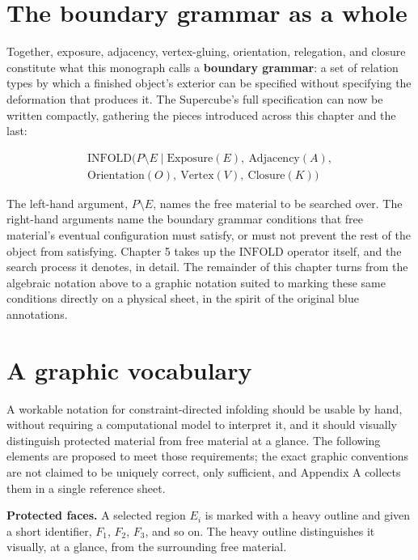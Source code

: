 \documentclass[11pt,oneside]{book}
\begin{document}
\hypertarget{the-boundary-grammar-as-a-whole}{%
\section{The boundary grammar as a
whole}\label{the-boundary-grammar-as-a-whole}}

Together, exposure, adjacency, vertex-gluing, orientation, relegation,
and closure constitute what this monograph calls a \textbf{boundary
grammar}: a set of relation types by which a finished object's exterior
can be specified without specifying the deformation that produces it.
The Supercube's full specification can now be written compactly,
gathering the pieces introduced across this chapter and the last:

\begin{gather*}
\text{INFOLD}(P \setminus E \mid \text{Exposure}(E),\ \text{Adjacency}(A),\\
\text{Orientation}(O),\ \text{Vertex}(V),\ \text{Closure}(K))
\end{gather*}

The left-hand argument, \(P \setminus E\), names the free material to be
searched over. The right-hand arguments name the boundary grammar
conditions that free material's eventual configuration must satisfy, or
must not prevent the rest of the object from satisfying. Chapter 5 takes
up the \(\text{INFOLD}\) operator itself, and the search process it
denotes, in detail. The remainder of this chapter turns from the
algebraic notation above to a graphic notation suited to marking these
same conditions directly on a physical sheet, in the spirit of the
original blue annotations.

\hypertarget{a-graphic-vocabulary}{%
\section{A graphic vocabulary}\label{a-graphic-vocabulary}}

A workable notation for constraint-directed infolding should be usable
by hand, without requiring a computational model to interpret it, and it
should visually distinguish protected material from free material at a
glance. The following elements are proposed to meet those requirements;
the exact graphic conventions are not claimed to be uniquely correct,
only sufficient, and Appendix A collects them in a single reference
sheet.

\textbf{Protected faces.} A selected region \(E_i\) is marked with a
heavy outline and given a short identifier, \(F_1\), \(F_2\), \(F_3\),
and so on. The heavy outline distinguishes it visually, at a glance,
from the surrounding free material.
\end{document}
